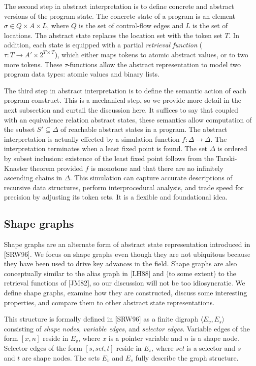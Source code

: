 \documentclass{article}
\begin{document}
The second step in abstract interpretation is to define concrete and
abstract versions of the program state.  The concrete state of a program is
an element $\sigma \in Q \times A \times L$, where $Q$ is the set of
control-flow edges and $L$ is the set of locations. The abstract state
replaces the location set with the token set $T$. In addition, each state is
equipped with a partial \textit{retrieval function} ($\tau : T \rightarrow
A' \times 2^{T \times T}$), which either maps tokens to atomic abstract
values, or to two more tokens. These $\tau$-functions allow the abstract
representation to model two program data types: atomic values and binary
lists.

The third step in abstract interpretation is to define the semantic action
of each program construct. This is a mechanical step, so we provide more
detail in the next subsection and curtail the discussion here. It suffices
to say that coupled with an equivalence relation abstract states, these
semantics allow computation of the subset $S' \subseteq \Delta$ of reachable
abstract states in a program. The abstract interpretation is actually
effected by a simulation function $f : \Delta \rightarrow \Delta$. The
interpretation terminates when a least fixed point is found. The set
$\Delta$ is ordered by subset inclusion: existence of the least fixed point
follows from the Tarski-Knaster theorem provided $f$ is monotone and that
there are no infinitely ascending chains in $\Delta$. This simulation can
capture accurate descriptions of recursive data structures, perform
interprocedural analysis, and trade speed for precision by adjusting its
token sets. It is a flexible and foundational idea.

\subsection{Shape graphs}

Shape graphs are an alternate form of abstract state representation
introduced in [SRW96]. We focus on shape graphs even though they are not
ubiquitous because they have been used to drive key advances in the field.
Shape graphs are also conceptually similar to the alias graph in [LH88] and
(to some extent) to the retrieval functions of [JM82], so our discussion
will not be too idiosyncratic. We define shape graphs, examine how they are
constructed, discuss some interesting properties, and compare them to other
abstract state representations.

This structure is formally defined in [SRW96] as a
finite digraph $\langle E_v, E_s \rangle$ consisting of \textit{shape
nodes}, \textit{variable edges}, and \textit{selector edges}. Variable edges
of the form $[x, n]$ reside in $E_v$, where $x$ is a pointer variable and
$n$ is a shape node. Selector edges of the form $[s, sel, t]$ reside in
$E_s$, where $sel$ is a selector and $s$ and $t$ are shape nodes. The sets
$E_v$ and $E_s$ fully describe the graph structure. 
\end{document}
